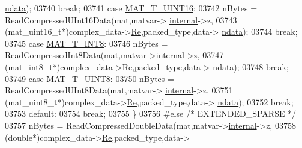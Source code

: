 \begin{DoxyCode}
{{{{{{{{{{{{{{{{{{      \hyperlink{group___m_a_t_a1beb8a8c58a808207cbea650563a9b63}{ndata});
03740                             \textcolor{keywordflow}{break};
03741                         \textcolor{keywordflow}{case} \hyperlink{group___m_a_t_ggacf7b3b879282b7ab3a51190e49bf3453a05bc7af7680aa68be95126ae0a4c2e31}{MAT\_T\_UINT16}:
03742                             nBytes = ReadCompressedUInt16Data(mat,matvar->
      \hyperlink{group___m_a_t_a6e97e3ed9f40c49322c18561c2a94e92}{internal}->z,
03743                                  (mat\_uint16\_t*)complex\_data->\hyperlink{group___m_a_t_a484a93607508adac2bce53a0252e0325}{Re},packed\_type,data->
      \hyperlink{group___m_a_t_a1beb8a8c58a808207cbea650563a9b63}{ndata});
03744                             \textcolor{keywordflow}{break};
03745                         \textcolor{keywordflow}{case} \hyperlink{group___m_a_t_ggacf7b3b879282b7ab3a51190e49bf3453a9807f5033ed4f9b548953742d9fd1658}{MAT\_T\_INT8}:
03746                             nBytes = ReadCompressedInt8Data(mat,matvar->\hyperlink{group___m_a_t_a6e97e3ed9f40c49322c18561c2a94e92}{internal}->z,
03747                                  (mat\_int8\_t*)complex\_data->\hyperlink{group___m_a_t_a484a93607508adac2bce53a0252e0325}{Re},packed\_type,data->
      \hyperlink{group___m_a_t_a1beb8a8c58a808207cbea650563a9b63}{ndata});
03748                             \textcolor{keywordflow}{break};
03749                         \textcolor{keywordflow}{case} \hyperlink{group___m_a_t_ggacf7b3b879282b7ab3a51190e49bf3453a01c1bd7db68f90552862eb5d311be408}{MAT\_T\_UINT8}:
03750                             nBytes = ReadCompressedUInt8Data(mat,matvar->
      \hyperlink{group___m_a_t_a6e97e3ed9f40c49322c18561c2a94e92}{internal}->z,
03751                                  (mat\_uint8\_t*)complex\_data->\hyperlink{group___m_a_t_a484a93607508adac2bce53a0252e0325}{Re},packed\_type,data->
      \hyperlink{group___m_a_t_a1beb8a8c58a808207cbea650563a9b63}{ndata});
03752                             \textcolor{keywordflow}{break};
03753                         \textcolor{keywordflow}{default}:
03754                             \textcolor{keywordflow}{break};
03755                     \}
03756 \textcolor{preprocessor}{#else    }\textcolor{comment}{/* EXTENDED\_SPARSE */}\textcolor{preprocessor}{}
03757                     nBytes = ReadCompressedDoubleData(mat,matvar->\hyperlink{group___m_a_t_a6e97e3ed9f40c49322c18561c2a94e92}{internal}->z,
03758                                  (\textcolor{keywordtype}{double}*)complex\_data->\hyperlink{group___m_a_t_a484a93607508adac2bce53a0252e0325}{Re},packed\_type,data->
}}}}}}}}}}}}}}}}}}
\end{DoxyCode}
